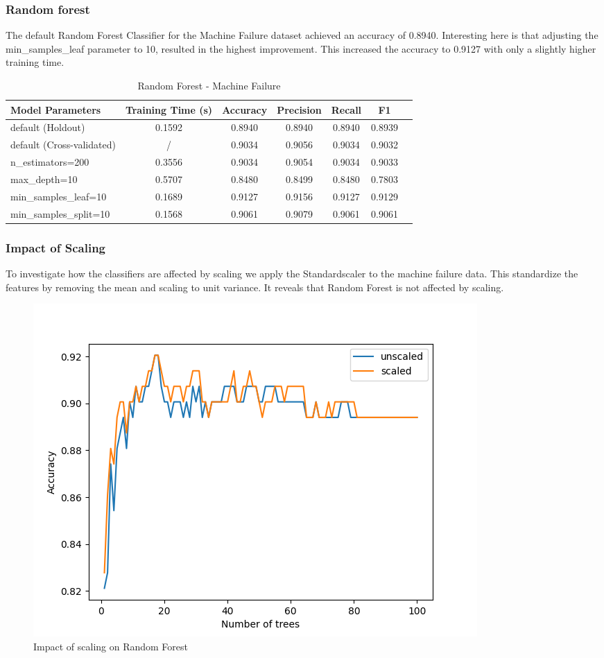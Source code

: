 \documentclass{article}
\begin{document}
\subsubsection*{Random forest}
The default Random Forest Classifier for the Machine Failure dataset achieved an accuracy of 0.8940. Interesting here is that
adjusting the min\_samples\_leaf parameter to 10, resulted in the highest improvement. This increased the accuracy to 0.9127 with only a slightly higher training time.
\begin{table}[ht]
\centering
\begin{tabular}{l|c|c|c|c|c|c}
\textbf{Model Parameters} & \textbf{Training Time (s)} & \textbf{Accuracy} & \textbf{Precision} & \textbf{Recall} & \textbf{F1} \\\hline
default (Holdout) & 0.1592  & 0.8940 & 0.8940 & 0.8940 & 0.8939 \\
default (Cross-validated) & /  & 0.9034 & 0.9056 & 0.9034 & 0.9032 \\
n\_estimators=200 & 0.3556  & 0.9034 & 0.9054 & 0.9034  & 0.9033 \\
max\_depth=10 & 0.5707  & 0.8480 & 0.8499 & 0.8480 & 0.7803 \\
min\_samples\_leaf=10 & 0.1689  & 0.9127  & 0.9156 & 0.9127  & 0.9129 \\
min\_samples\_split=10 & 0.1568  & 0.9061 & 0.9079 & 0.9061 & 0.9061 \\
\end{tabular}
\caption{Random Forest - Machine Failure}
\label{tab:Random Forest - Machine Failure}
\end{table}
\subsubsection{Impact of Scaling}
To investigate how the classifiers are affected by scaling we apply the Standardscaler to the machine failure data. This standardize the features by removing the mean and scaling to unit variance.
It reveals that Random Forest is not affected by scaling.
\begin{figure}[H]
\centering
\includegraphics[width=0.5\linewidth]{Machine_scaling.png}
\caption{\label{fig:hist:price}Impact of scaling on Random Forest}
\end{figure}
\end{document}
